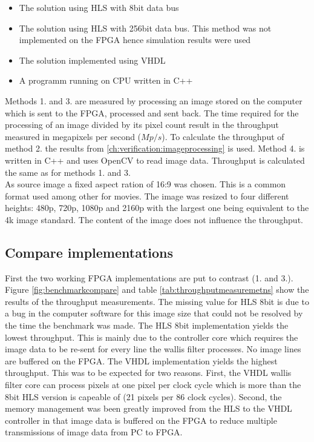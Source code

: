 \begin{itemize}
    \item The solution using HLS with 8bit data bus
    \item The solution using HLS with 256bit data bus. This method was not
    implemented on the FPGA hence simulation results were used
    \item The solution implemented using VHDL
    \item A programm running on CPU written in C++
\end{itemize}

Methods 1. and 3. are measured by processing an image stored on the computer
which is sent to the FPGA, processed and sent back. The time required for the
processing of an image divided by its pixel count result in the throughput
measured in megapixels per second ($Mp/s$). To calculate the throughput of
method 2. the results from \ref{ch:verification:imageprocessing} is used. Method
4. is written in C++ and uses OpenCV to read image data. Throughput is
calculated the same as for methods 1. and 3.
\\

As source image a fixed aspect ration of 16:9 was chosen. This is a common
format used among other for movies. The image was resized to four different
heights: 480p, 720p, 1080p and 2160p with the largest one being equivalent to
the
4k image standard. The content of the image does not influence the throughput.

\subsection{Compare implementations}
First the two working FPGA implementations are put to contrast (1. and 3.).
Figure \ref{fig:benchmarkcompare} and table \ref{tab:throughputmeasuremetns}
show the results of the throughput measurements. The missing value for HLS 8bit
is due to a bug in the computer software for this image size that could not be
resolved by the time the benchmark was made. The HLS 8bit implementation yields
the lowest throughput. This is mainly due to the controller core which requires
the image data to be re-sent for every line the wallis filter processes. No
image lines are buffered on the FPGA. The VHDL implementation yields the
highest
throughput. This was to be expected for two
reasons. First, the VHDL wallis filter core can process pixels at one pixel per
clock cycle which is more than the 8bit HLS version is capeable of (21 pixels
per 86 clock cycles).
Second, the memory management was been greatly improved from the HLS to the VHDL
controller in that image data is buffered on the FPGA to reduce multiple
transmissions of image data from PC to FPGA. 

